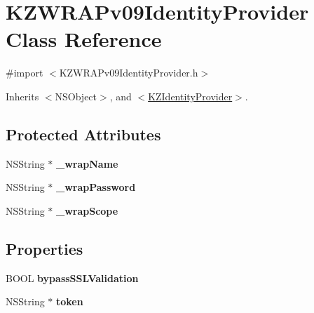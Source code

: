 \hypertarget{interface_k_z_w_r_a_pv09_identity_provider}{\section{K\-Z\-W\-R\-A\-Pv09\-Identity\-Provider Class Reference}
\label{interface_k_z_w_r_a_pv09_identity_provider}
}


{\ttfamily \#import $<$K\-Z\-W\-R\-A\-Pv09\-Identity\-Provider.\-h$>$}



Inherits $<$\-N\-S\-Object$>$, and \hyperlink{protocol_k_z_identity_provider-p}{$<$\-K\-Z\-Identity\-Provider$>$}.

\subsection*{Protected Attributes}
\begin{DoxyCompactItemize}
\item 
\hypertarget{interface_k_z_w_r_a_pv09_identity_provider_a970a1f2d70aa402fa2f1f71bc4e4e42e}{N\-S\-String $\ast$ {\bfseries \-\_\-wrap\-Name}}\label{interface_k_z_w_r_a_pv09_identity_provider_a970a1f2d70aa402fa2f1f71bc4e4e42e}

\item 
\hypertarget{interface_k_z_w_r_a_pv09_identity_provider_a3cd2a01016579f072760fabcb277114f}{N\-S\-String $\ast$ {\bfseries \-\_\-wrap\-Password}}\label{interface_k_z_w_r_a_pv09_identity_provider_a3cd2a01016579f072760fabcb277114f}

\item 
\hypertarget{interface_k_z_w_r_a_pv09_identity_provider_a07a04c094e88a0f238ba32498c95fb07}{N\-S\-String $\ast$ {\bfseries \-\_\-wrap\-Scope}}\label{interface_k_z_w_r_a_pv09_identity_provider_a07a04c094e88a0f238ba32498c95fb07}

\end{DoxyCompactItemize}
\subsection*{Properties}
\begin{DoxyCompactItemize}
\item 
\hypertarget{interface_k_z_w_r_a_pv09_identity_provider_ac9af8a90a35fda5370e93645a4812f08}{B\-O\-O\-L {\bfseries bypass\-S\-S\-L\-Validation}}\label{interface_k_z_w_r_a_pv09_identity_provider_ac9af8a90a35fda5370e93645a4812f08}

\item 
\hypertarget{interface_k_z_w_r_a_pv09_identity_provider_a1b161e3443596b408a399878e61f1e91}{N\-S\-String $\ast$ {\bfseries token}}\label{interface_k_z_w_r_a_pv09_identity_provider_a1b161e3443596b408a399878e61f1e91}

\end{DoxyCompactItemize}
